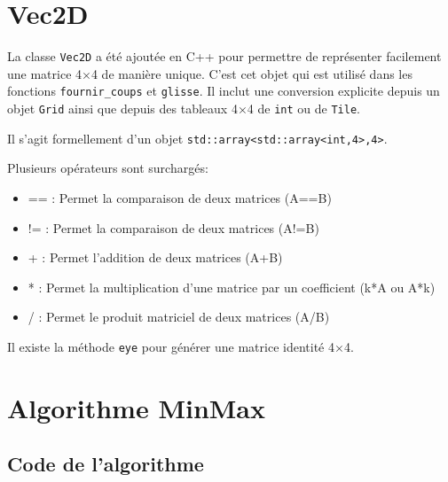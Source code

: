 \documentclass[a4paper]{report}
\begin{document}
\section{Vec2D}
La classe \verb|Vec2D| a été ajoutée en C++ pour permettre de représenter facilement une matrice 4$\times$4 de manière unique. C'est cet objet qui est utilisé dans les fonctions \verb|fournir_coups| et \verb|glisse|. Il inclut une conversion explicite depuis un objet \verb|Grid| ainsi que depuis des tableaux 4$\times$4 de \verb|int| ou de \verb|Tile|.

Il s'agit formellement d'un objet \verb|std::array<std::array<int,4>,4>|.

Plusieurs opérateurs sont surchargés:
\begin{itemize}
\item == : Permet la comparaison de deux matrices (A==B)
\item != : Permet la comparaison de deux matrices (A!=B)
\item + : Permet l'addition de deux matrices (A+B)
\item * : Permet la multiplication d'une matrice par un coefficient (k*A ou A*k)
\item / : Permet le produit matriciel de deux matrices (A/B)
\end{itemize}

Il existe la méthode \verb|eye| pour générer une matrice identité 4$\times$4.





\section{Algorithme MinMax}
\subsection{Code de l'algorithme}



\end{document}
